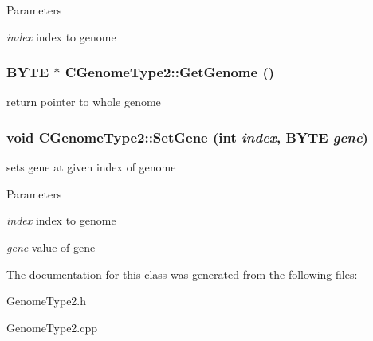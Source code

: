 \begin{DoxyParams}{Parameters}
\item[{\em index}]index to genome \end{DoxyParams}
\hypertarget{classCGenomeType2_a2c6cbf1f56c6cbc5217c06f820712557}{
\subsubsection[{GetGenome}]{\setlength{\rightskip}{0pt plus 5cm}BYTE $\ast$ CGenomeType2::GetGenome ()}}
\label{classCGenomeType2_a2c6cbf1f56c6cbc5217c06f820712557}
return pointer to whole genome \hypertarget{classCGenomeType2_ae1de66cbfe4425f371433caed2309eeb}{
\subsubsection[{SetGene}]{\setlength{\rightskip}{0pt plus 5cm}void CGenomeType2::SetGene (int {\em index}, \/  BYTE {\em gene})}}
\label{classCGenomeType2_ae1de66cbfe4425f371433caed2309eeb}
sets gene at given index of genome


\begin{DoxyParams}{Parameters}
\item[{\em index}]index to genome \item[{\em gene}]value of gene \end{DoxyParams}


The documentation for this class was generated from the following files:\begin{DoxyCompactItemize}
\item 
GenomeType2.h\item 
GenomeType2.cpp\end{DoxyCompactItemize}

